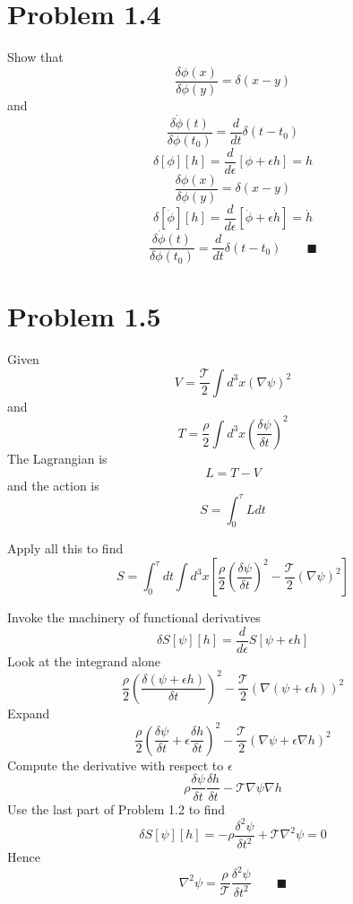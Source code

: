 \documentclass{amsart}
\begin{document}
\section*{Problem 1.4}
Show that \[\frac{\delta\phi(x)}{\delta\phi(y)}=\delta(x-y)\]
and \[\frac{\delta\dot{\phi}(t)}{\delta\phi(t_0)}=\frac{d}{dt}\delta(t-t_0)\]
\[\delta[\phi][h]=\frac{d}{d\epsilon}\left[\phi+\epsilon h\right]=h\]
\[\frac{\delta\phi(x)}{\delta\phi(y)}=\delta(x-y)\]
\[\delta[\dot{\phi}][h]=\frac{d}{d\epsilon}\left[\dot{\phi}+\epsilon \dot{h}\right]=\dot{h}\]
\[\frac{\delta\dot{\phi}(t)}{\delta\phi(t_0)}=\frac{d}{dt}\delta(t-t_0) \qquad \blacksquare\]


\section*{Problem 1.5}
Given \[V=\frac{\mathcal{T}}{2}\int d^3 x(\nabla\psi)^2\]
and \[T=\frac{\rho}{2}\int d^3 x\left(\frac{\delta \psi}{\delta t}\right)^2\]
The Lagrangian is \[L=T-V\] and the action is \[S=\int_0^\tau Ldt\]

Apply all this to find
\[S=\int_0^\tau dt \int d^3 x\left[\frac{\rho}{2}\left(\frac{\delta \psi}{\delta t}\right)^2 - \frac{\mathcal{T}}{2}(\nabla\psi)^2 \right]\]

Invoke the machinery of functional derivatives
\[\delta S[\psi][h]=\frac{d}{d\epsilon}S[\psi+\epsilon h]\]
Look at the integrand alone
\[\frac{\rho}{2}\left(\frac{\delta (\psi+\epsilon h)}{\delta t}\right)^2 - \frac{\mathcal{T}}{2}\left(\nabla(\psi+\epsilon h)\right)^2\]
Expand
\[\frac{\rho}{2}\left(\frac{\delta \psi}{\delta t}+\epsilon \frac{\delta h}{\delta t}\right)^2 - \frac{\mathcal{T}}{2}\left(\nabla \psi+\epsilon \nabla h\right)^2\]
Compute the derivative with respect to $\epsilon$
\[\rho\frac{\delta \psi}{\delta t}\frac{\delta h}{\delta t} - \mathcal{T}\nabla \psi \nabla h\]
Use the last part of Problem 1.2 to find
\[\delta S[\psi][h]=-\rho\frac{\delta^2 \psi}{\delta t^2} + \mathcal{T}\nabla^2 \psi =0\]
Hence
\[\nabla^2 \psi=\frac{\rho}{\mathcal{T}}\frac{\delta^2 \psi}{\delta t^2} \qquad \blacksquare\]
\end{document}
